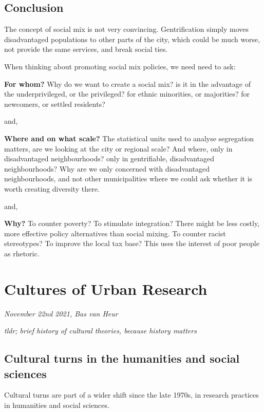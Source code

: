 \documentclass{article}
\begin{document}
\subsection{Conclusion}

The concept of social mix is not very convincing. Gentrification simply moves disadvantaged populations to other parts of the city, which could be much worse, not provide the same services, and break social ties. 

When thinking about promoting social mix policies, we need need to ask:

\textbf{For whom?}
Why do we want to create a social mix? is it in the advantage of the underprivileged, or the privileged? for ethnic minorities, or majorities? for newcomers, or settled residents?

and, 

\textbf{Where and on what scale?}
The statistical units used to analyse segregation matters, are we looking at the city or regional scale? And where, only in disadvantaged neighbourhoods? only in gentrifiable, disadvantaged neighbourhoods? 
Why are we only concerned with disadvantaged neighbourhoods, and not other municipalities where we could ask whether it is worth creating diversity there.

and,

\textbf{Why?}
To counter poverty? To stimulate integration? There might be less costly, more effective policy alternatives than social mixing.
To counter racist stereotypes? To improve the local tax base? This uses the interest of poor people as rhetoric.


\section{Cultures of Urban Research}
\textit{November 22nd 2021, Bas van Heur}

\textit{tldr; brief history of cultural theories, because history matters}

\subsection{Cultural turns in the humanities and social sciences}

Cultural turns are part of a wider shift since the late 1970s, in research practices in humanities and social sciences.
\end{document}
